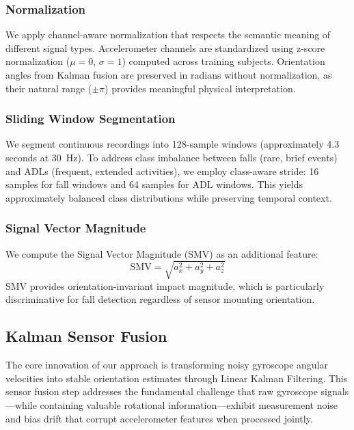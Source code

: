 \subsubsection{Normalization}
We apply channel-aware normalization that respects the semantic meaning of different signal types. Accelerometer channels are standardized using z-score normalization ($\mu=0$, $\sigma=1$) computed across training subjects. Orientation angles from Kalman fusion are preserved in radians without normalization, as their natural range ($\pm\pi$) provides meaningful physical interpretation.

\subsubsection{Sliding Window Segmentation}
We segment continuous recordings into 128-sample windows (approximately 4.3 seconds at 30~Hz). To address class imbalance between falls (rare, brief events) and ADLs (frequent, extended activities), we employ class-aware stride: 16 samples for fall windows and 64 samples for ADL windows. This yields approximately balanced class distributions while preserving temporal context.

\subsubsection{Signal Vector Magnitude}
We compute the Signal Vector Magnitude (SMV) as an additional feature:
\begin{equation}
\text{SMV} = \sqrt{a_x^2 + a_y^2 + a_z^2}
\label{eq:smv}
\end{equation}
SMV provides orientation-invariant impact magnitude, which is particularly discriminative for fall detection regardless of sensor mounting orientation.

\subsection{Kalman Sensor Fusion}
\label{subsec:kalman}

The core innovation of our approach is transforming noisy gyroscope angular velocities into stable orientation estimates through Linear Kalman Filtering. This sensor fusion step addresses the fundamental challenge that raw gyroscope signals---while containing valuable rotational information---exhibit measurement noise and bias drift that corrupt accelerometer features when processed jointly.

